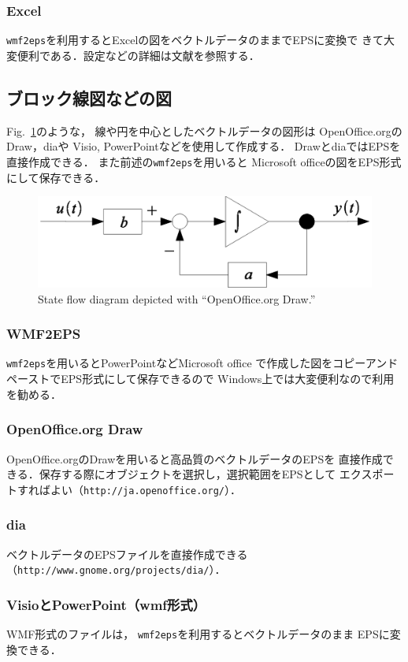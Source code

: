 \documentclass[onecolumn]{jsarticle}
\begin{document}
\subsubsection{Excel}
\texttt{wmf2eps}を利用するとExcelの図をベクトルデータのままでEPSに変換で
きて大変便利である．設定などの詳細は文献\cite{WMF2EPS}を参照する．

\subsection{ブロック線図などの図}
Fig.~\ref{fig:block}のような，
線や円を中心としたベクトルデータの図形は
OpenOffice.orgのDraw，diaや
Visio, PowerPointなどを使用して作成する．
DrawとdiaではEPSを直接作成できる．
また前述の\verb+wmf2eps+を用いると
Microsoft officeの図をEPS形式にして保存できる．
% 
\begin{figure}[tb]
  \centering
  \includegraphics[width=0.9\linewidth]{fig/SFDiagram.eps}
  \caption{State flow diagram depicted with ``OpenOffice.org Draw.''}
  \label{fig:block}
\end{figure}
\subsubsection{WMF2EPS}
\verb+wmf2eps+を用いるとPowerPointなどMicrosoft office
で作成した図をコピーアンドペーストでEPS形式にして保存できるので
Windows上では大変便利なので利用を勧める\cite{WMF2EPS}．
\subsubsection{OpenOffice.org Draw}
OpenOffice.orgのDrawを用いると高品質のベクトルデータのEPSを
直接作成できる．保存する際にオブジェクトを選択し，選択範囲をEPSとして
エクスポートすればよい（\verb+http://ja.openoffice.org/+）．
\subsubsection{dia}
ベクトルデータのEPSファイルを直接作成できる
（\verb+http://www.gnome.org/projects/dia/+）．
\subsubsection{VisioとPowerPoint（wmf形式）}
WMF形式のファイルは，
\texttt{wmf2eps}を利用するとベクトルデータのまま
EPSに変換できる．
\end{document}
